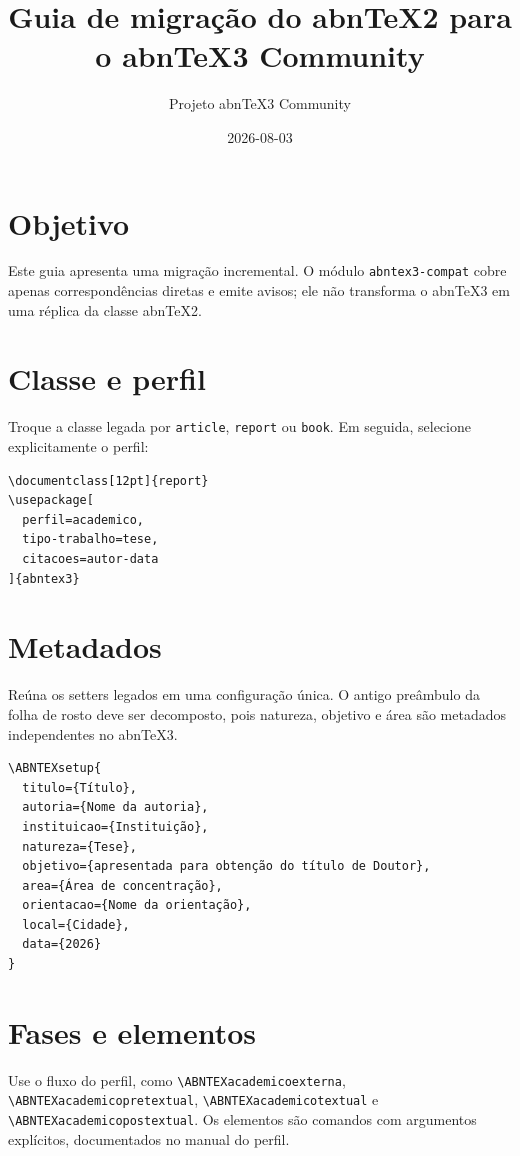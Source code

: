 \documentclass[12pt]{article}
\title{Guia de migração do abnTeX2 para o abnTeX3 Community}
\author{Projeto abnTeX3 Community}
\date{2026-08-03}
\begin{document}
\maketitle

\section{Objetivo}

Este guia apresenta uma migração incremental. O módulo
\texttt{abntex3-compat} cobre apenas correspondências diretas e emite avisos;
ele não transforma o abnTeX3 em uma réplica da classe abnTeX2.

\section{Classe e perfil}

Troque a classe legada por \texttt{article}, \texttt{report} ou
\texttt{book}. Em seguida, selecione explicitamente o perfil:

\begin{verbatim}
\documentclass[12pt]{report}
\usepackage[
  perfil=academico,
  tipo-trabalho=tese,
  citacoes=autor-data
]{abntex3}
\end{verbatim}

\section{Metadados}

Reúna os setters legados em uma configuração única. O antigo preâmbulo da
folha de rosto deve ser decomposto, pois natureza, objetivo e área são
metadados independentes no abnTeX3.

\begin{verbatim}
\ABNTEXsetup{
  titulo={Título},
  autoria={Nome da autoria},
  instituicao={Instituição},
  natureza={Tese},
  objetivo={apresentada para obtenção do título de Doutor},
  area={Área de concentração},
  orientacao={Nome da orientação},
  local={Cidade},
  data={2026}
}
\end{verbatim}

\section{Fases e elementos}

Use o fluxo do perfil, como \verb|\ABNTEXacademicoexterna|,
\verb|\ABNTEXacademicopretextual|, \verb|\ABNTEXacademicotextual| e
\verb|\ABNTEXacademicopostextual|. Os elementos são comandos com argumentos
explícitos, documentados no manual do perfil.
\end{document}
